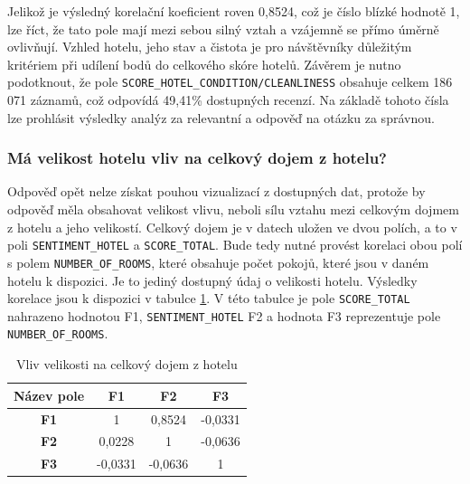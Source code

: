 \documentclass[czech,BP]{thesiskiv}
\begin{document}
Jelikož je výsledný korelační koeficient roven 0,8524, což je číslo blízké hodnotě 1, lze říct, že tato pole mají mezi sebou silný vztah a vzájemně se přímo úměrně ovlivňují. Vzhled hotelu, jeho stav a čistota je pro návštěvníky důležitým kritériem při udílení bodů do celkového skóre hotelů. Závěrem je nutno podotknout, že pole \texttt{SCORE\_HO\-TEL\_CONDITION/CLEANLINESS} obsahuje celkem 186 071 záznamů, což odpovídá 49,41\% dostupných recenzí. Na základě tohoto čísla lze prohlásit výsledky analýz za relevantní a odpověď na otázku za správnou.

\subsubsection{Má velikost hotelu vliv na celkový dojem z hotelu?}
\label{subsub:velikost hotelu}
Odpověď opět nelze získat pouhou vizualizací z dostupných dat, protože by odpověď měla obsahovat velikost vlivu, neboli sílu vztahu mezi celkovým dojmem z hotelu a jeho velikostí. Celkový dojem je v datech uložen ve dvou polích, a to v poli \texttt{SENTIMENT\_HOTEL} a \texttt{SCORE\_TOTAL}. Bude tedy nutné provést korelaci obou polí s polem \texttt{NUMBER\_OF\_ROOMS}, které obsahuje počet pokojů, které jsou v daném hotelu k dispozici. Je to jediný dostupný údaj o velikosti hotelu.  Výsledky korelace jsou k dispozici v tabulce \ref{hotel_korelace}. V této tabulce je pole \texttt{SCORE\_TOTAL} nahrazeno hodnotou F1, \texttt{SENTIMENT\_HOTEL} F2 a hodnota F3 reprezentuje pole \texttt{NUMBER\_OF\_ROOMS}.

\begin{table}[h]
	\centering

	\begin{tabular}{c|c c c}
		
		\textbf{Název pole} & \textbf{F1} & \textbf{F2} & \textbf{F3} \\ \hline
		\textbf{F1}     & 1               & 0,8524          & -0,0331         \\ 
		\textbf{F2}     & 0,0228          & 1               & -0,0636         \\ 
		\textbf{F3}     & -0,0331         & -0,0636         & 1               \\ 
	\end{tabular}
	\caption{Vliv velikosti na celkový dojem z hotelu}
\label{hotel_korelace}
\end{table}
\end{document}
